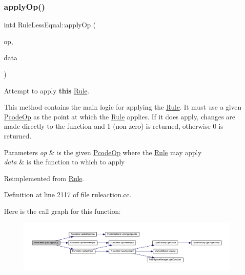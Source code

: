 \subsubsection{\texorpdfstring{applyOp()}{applyOp()}}
{\footnotesize\ttfamily int4 Rule\+Less\+Equal\+::apply\+Op (\begin{DoxyParamCaption}\item[{\mbox{\hyperlink{class_pcode_op}{Pcode\+Op}} $\ast$}]{op,  }\item[{\mbox{\hyperlink{class_funcdata}{Funcdata}} \&}]{data }\end{DoxyParamCaption})\hspace{0.3cm}{\ttfamily [virtual]}}



Attempt to apply {\bfseries{this}} \mbox{\hyperlink{class_rule}{Rule}}. 

This method contains the main logic for applying the \mbox{\hyperlink{class_rule}{Rule}}. It must use a given \mbox{\hyperlink{class_pcode_op}{Pcode\+Op}} as the point at which the \mbox{\hyperlink{class_rule}{Rule}} applies. If it does apply, changes are made directly to the function and 1 (non-\/zero) is returned, otherwise 0 is returned. 
\begin{DoxyParams}{Parameters}
{\em op} & is the given \mbox{\hyperlink{class_pcode_op}{Pcode\+Op}} where the \mbox{\hyperlink{class_rule}{Rule}} may apply \\
\hline
{\em data} & is the function to which to apply \\
\hline
\end{DoxyParams}


Reimplemented from \mbox{\hyperlink{class_rule_a4e3e61f066670175009f60fb9dc60848}{Rule}}.



Definition at line 2117 of file ruleaction.\+cc.

Here is the call graph for this function\+:
\nopagebreak
\begin{figure}[H]
\begin{center}
\leavevmode
\includegraphics[width=350pt]{class_rule_less_equal_ab76fe328e8caf6ab480a60e3fb1927bf_cgraph}
\end{center}
\end{figure}
\mbox{\label{class_rule_less_equal_ab4b8ad51cf9caf54df481de1346ee60f}} 
